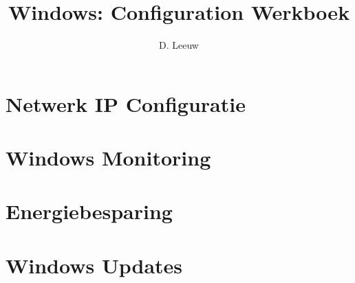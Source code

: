 \documentclass[a4paper,12pt,twoside,titlepage]{article}
\author{D. Leeuw}
\title{Windows: Configuration Werkboek}
\date{\today\\
0.0.0
\vfill
\raggedright
\copyright\ 2025 Dennis Leeuw\\
}
\begin{document}

\maketitle



\section{Netwerk IP Configuratie}


\section{Windows Monitoring}


\section{Energiebesparing}


\section{Windows Updates}


\printindex
\end{document}
